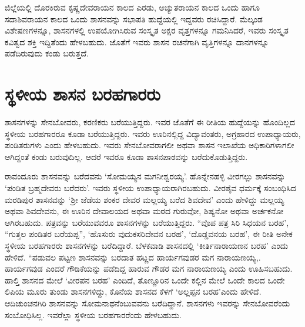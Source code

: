 ಜಿಲ್ಲೆಯಲ್ಲಿ ದೊರಕಿರುವ ಕೃಷ್ಣದೇವರಾಯನ ಕಾಲದ ಎರಡು, ಅಚ್ಯುತರಾಯನ ಕಾಲದ ಒಂದು ಹಾಗೂ ಸದಾಶಿವರಾಯನ ಕಾಲದ ಒಂದು ಶಾಸನವನ್ನು ಸಭಾಪತಿ ಹುದ್ದೆಯಲ್ಲಿ ಇದ್ದವರು ರಚಿಸಿದ್ದಾರೆ. ಮೆಲ್ಕಂಡ ವಿಶೇಷಣಗಳನ್ನೂ, ಶಾಸನಗಳಲ್ಲಿ ಉಪಯೋಗಿಸಿರುವ ಸಂಸ್ಕೃತ ಅಕ್ಷರ ವೃತ್ತಗಳನ್ನೂ ಗಮನಿಸಿದರೆ, ಇವರು ಸಂಸ್ಕೃತ ಕವಿತ್ವದ ಶಕ್ತಿ ಇದ್ದಿತೆಂದು ಹೇಳಬಹುದು. ಜೊತೆಗೆ ಇವರು ಶಾಸನ ರಚನೆಗಾಗಿ ವೃತ್ತಿಗಳನ್ನೂ ದಾನಗಳನ್ನೂ ಪಡೆದಿರುವುದು ಕಂಡು ಬರುತ್ತದೆ.


\section{ಸ್ಥಳೀಯ ಶಾಸನ ಬರಹಗಾರರು}

ಶಾಸನಗಳನ್ನು ಸೇನಬೋವರು, ಕರಣಿಕರು ಬರೆಯುತ್ತಿದ್ದರು. ಇವರ ಜೊತೆಗೆ ಈ ರೀತಿಯ ಹುದ್ದೆಯನ್ನು ಹೊಂದಿಲ್ಲದ ಸ್ಥಳೀಯ ಬರಹಗಾರರೂ ಕೂಡಾ ಬರೆಯುತ್ತಿದ್ದರು. ಇವರು ಊರಿನಲ್ಲಿದ್ದ ವಿದ್ಯಾವಂತರು, ಅಗ್ರಹಾರದ ಉಪಾಧ್ಯಾಯರು, ಪಂಡಿತರುಗಳು ಎಂದು ಹೇಳಬಹುದು. ಇವರು ಸೇನಬೋವರಾಗಲೀ ಅಥವಾ ಶಾಸನ ಇಲಾಖೆಯ ಅಧಿಕಾರಿಗಳಾಗಲೀ ಆಗಿದ್ದಂತೆ ಕಂಡು ಬರುವುದಿಲ್ಲ. ಆದರೆ ಇವರೂ ಕೂಡಾ ಶಾಸನಪಾಠವನ್ನು ಬರೆದುಕೊಡುತ್ತಿದ್ದರು.

ರಾವಂದೂರು ಶಾಸನವನ್ನು ಬರೆದವನು ‘ಸೋಮಯ್ಯನ ಮಗನೀಶ್ವರಯ್ಯ’. ಹೊನ್ನೇನಹಳ್ಳಿ ವೀರಗಲ್ಲು ಶಾಸನವನ್ನು ‘ಪಂಡಿತ ಬ್ರಹ್ಮದೇವರು ಬರೆದರು’. ಇವರು ಸ್ಥಳೀಯ ಉಪಾಧ್ಯಾಯರಾಗಿರಬಹುದು. ವೀರಶೈವ ಧರ್ಮಕ್ಕೆ ಸಂಬಂಧಿಸಿದ ಮರಡಿಪುರ ಶಾಸನವನ್ನು ‘ಶ‍್ರೀ ಜೆಡೆಯ ಶಂಕರ ದೇವರ ಮಲ್ಲಯ್ಯ ಬರೆದ ಶಿವದೇವ’ ಎಂದು ಹೇಳಿದ್ದು ಮಲ್ಲಯ್ಯ ಅಥವಾ ಶಿವದೇವನು, ಈ ಊರಿನ ದೇವಾಲಯದ ಅಥವಾ ಮಠದ ಗುರುವೋ, ಶಿಷ್ಯನೋ ಅಥವಾ ಅರ್ಚಕನೋ ಆಗಿರಬಹುದು. ಪತ್ರವನ್ನು ಬರೆಯುವವರೂ ಶಾಸನಗಳನ್ನು ಬರೆಯುತ್ತಿದ್ದರು. “ವೊಪ ಪತ್ರ ಸಿರಿ ಸಿಧಯನ ಬರಹ’, “ಗುತ್ತಲ ಪಂಡಿತರ ಬರೆಯಪ್ಪ”, ‘ಹೊಸುರು ವುದುಕಸರಿದೇವನ ಬರಹ’, ‘ದೊಡ್ಡವನಯ ಬರಹ’, ಈ ರೀತಿ ಅನೇಕ ಸ್ಥಳೀಯ ಬರಹಗಾರರು ಶಾಸನಗಳನ್ನು ಬರೆದಿದ್ದಾರೆ. ಬೆಳಕವಾಡಿ ಶಾಸನದಲ್ಲಿ ‘ಕೀರ್ತಿನಾರಾಯಣನ ಬರಹ’ ಎಂದು ಹೇಳಿದೆ. “ಪಡುವಲ ಪಟ್ಟಣ ಶಾಸನವನ್ನು ಬರದಾತ ಹಟ್ಣದ ಹಾರ್ಯಗವುಡರ ಮಗ ನಾರಾಯಣಯ್ಯ,. ಹಾರ್ಯಗವುಡ ಎಂದರೆ ಗೌಡಿಕೆಯನ್ನು ಪಡೆದಿದ್ದ ಹಾರುವ ಗೌಡರ ಮಗ ನಾರಾಯಣಯ್ಯ ಎಂದು ಊಹಿಸಬಹುದು. ಹಾಲ್ತಿ ಶಾಸನದ ಮೇಲೆ ‘ವೀರಪನ ಬರಹ’ ಎಂದಿದೆ, ತೊಣ್ಣೂರಿನ ಒಂದೇ ಕಲ್ಲಿನ ಮೇಲೆ ಒಂದೇ ಕಾಲದ ಒಂದೇ ಲಿಪಿಯ ಮೂರು ತುಂಡು ಶಾಸನಗಳಿದ್ದು, ಕೊನೆಯ ಶಾಸನದ ಕೆಳಗೆ ‘ಅಲ್ಲಪ್ಪನ ಬರಹ’ಎಂದು ಹೇಳಿದೆ. ಆದಿಚುಂಚನಗಿರಿ ಶಾಸನವನ್ನು ಸೋಮನಾಥನೆಂಬುವವನು ಬರೆದಿದ್ದಾನೆ. ಶಾಸನಗಳು ಇವರನ್ನು ಸೇನಬೋವರೆಂದು ಸಂಬೋಧಿಸಿಲ್ಲ. ಇವರೆಲ್ಲಾ ಸ್ಥಳೀಯ ಬರಹಗಾರರೆಂದು ಹೇಳಬಹುದು.


